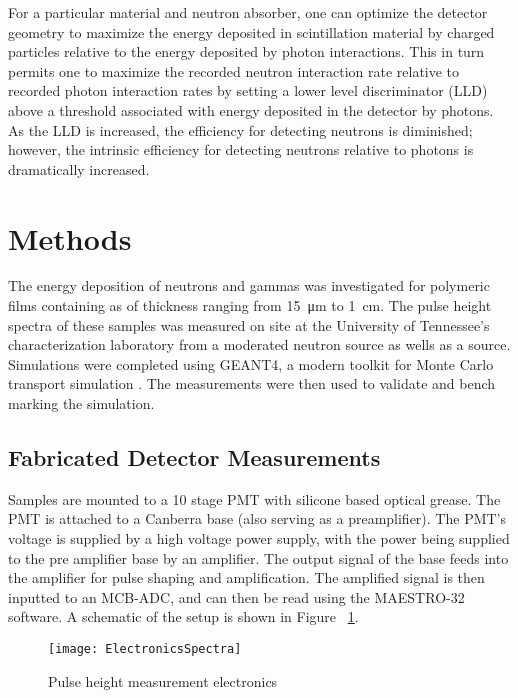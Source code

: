 \documentclass[draftcls,onecolumn]{IEEEtran}
\begin{document}
For a particular material and neutron absorber, one can optimize the detector geometry to maximize the energy deposited in scintillation material by charged particles relative to the energy deposited by photon interactions. 
This in turn permits one to maximize the recorded neutron interaction rate relative to recorded photon interaction rates by setting a lower level discriminator (LLD) above a threshold associated with energy deposited in the detector by photons.  
As the LLD is increased, the efficiency for detecting neutrons is diminished; however, the intrinsic efficiency for detecting neutrons relative to photons is dramatically increased. 

\section{Methods}
\label{sec:Methods}
The energy deposition of neutrons and gammas was investigated for polymeric films containing  as  of thickness ranging from \SI{15}{\um} to \SI{1}{\cm}.
The pulse height spectra of these samples was measured on site at the University of Tennessee's characterization laboratory from a moderated neutron source as wells as a  source.
Simulations were completed using GEANT4, a modern toolkit for Monte Carlo transport simulation \cite{agostinelli_geant4simulation_2003,allison_geant4_2006}.
The measurements were then used to validate and bench marking the simulation.

\subsection{Fabricated Detector Measurements}
Samples are mounted to a 10 stage PMT with silicone based optical grease. 
The PMT is attached to a Canberra base (also serving as a preamplifier). 
The PMT's voltage is supplied by a high voltage power supply, with the power being supplied to the pre amplifier base by an amplifier.  
The output signal of the base feeds into the amplifier for pulse shaping and amplification. 
The amplified signal is then inputted to an MCB-ADC, and can then be read using the MAESTRO-32 software. 
A schematic of the setup is shown in Figure ~\ref{fig:ElectronicsSpectra}.
\begin{figure}
	\centering
	\texttt{[image: ElectronicsSpectra]}
	\caption{Pulse height measurement electronics}
	\label{fig:ElectronicsSpectra}
\end{figure}
\end{document}
